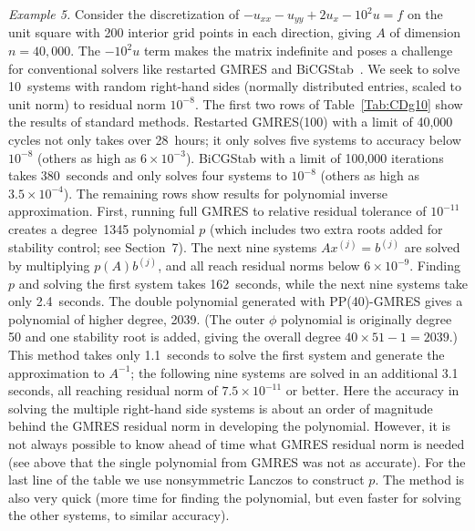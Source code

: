 \documentclass{siamart}
\begin{document}
{\it Example 5.}   Consider the discretization of  $- u_{xx} - u_{yy} + 2 u_{x} - 10^2 u = f $ on the unit square with 200 interior grid points in each direction, giving $A$ of dimension $n=40{,}000$.  The $-10^2 u$ term makes the matrix indefinite and poses a challenge for conventional solvers like restarted GMRES and BiCGStab~\cite{vdV92}. We seek to solve 10~systems with random  right-hand sides (normally distributed entries, scaled to unit norm) to  residual norm $10^{-8}$.  The first two rows of Table~\ref{Tab:CDg10} show the results of standard methods.
Restarted GMRES(100) with a limit of 40{,}000 cycles not only takes over 28~hours; it only solves five systems to accuracy below $10^{-8}$ (others as high as $6\times 10^{-3}$).  BiCGStab with a limit of 100{,}000 iterations takes 380~seconds and only solves four systems to $10^{-8}$ (others as high as $3.5\times 10^{-4}$).  
The remaining rows show results for polynomial inverse approximation.
First, running full GMRES to relative residual tolerance of $10^{-11}$ creates a degree~1345 polynomial $p$ (which includes two extra roots added for stability control; see Section~7).  The next nine systems $Ax^{(j)} = b^{(j)}$ are solved by multiplying $p(A) b^{(j)}$, and all reach residual norms below $6 \times 10^{-9}$.   Finding $p$ and solving the first system takes 162~seconds,  while the next nine systems take only 2.4~seconds. 
The double polynomial generated with PP(40)-GMRES gives a polynomial of higher degree, 2039. (The outer $\phi$ polynomial is originally degree 50 and one stability root is added, giving the overall degree $40\times 51-1 = 2039$.)  This method takes only 1.1~seconds to solve the first system and generate the approximation to $A^{-1}$; the following nine systems are solved in an additional 3.1 seconds, all reaching residual norm of $7.5\times 10^{-11}$ or better.  
Here the accuracy in solving the multiple right-hand side systems is about an order of magnitude behind the GMRES residual norm in developing the polynomial.  However, it is not always possible to know ahead of time what GMRES residual norm is needed (see above that the single polynomial from GMRES was not as accurate). 
For the last line of the table we use nonsymmetric Lanczos to construct $p$.  The method is also very quick (more time for finding the polynomial, but even faster for solving the other systems, to similar accuracy).  
\end{document}

